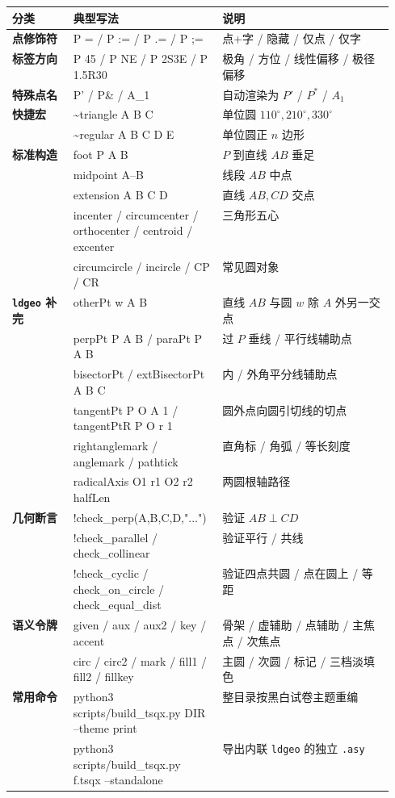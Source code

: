 \documentclass[11pt,oneside,fontset=none]{ctexbook}
\newcommand{\code}[1]{\texttt{#1}}
\begin{document}
\begin{table}[H]
  \centering
  \footnotesize
  \renewcommand{\arraystretch}{1.04}
  \begin{tabularx}{\linewidth}{@{}>{\bfseries}p{0.16\linewidth}>{\ttfamily\raggedright\arraybackslash}p{0.39\linewidth}>{\raggedright\arraybackslash}X@{}}
    \toprule
    分类 & 典型写法 & 说明 \\
    \midrule
    点修饰符 & P = / P := / P .= / P ;= & 点+字 / 隐藏 / 仅点 / 仅字 \\
    标签方向 & P 45 / P NE / P 2S3E / P 1.5R30 & 极角 / 方位 / 线性偏移 / 极径偏移 \\
    特殊点名 & P' / P\& / A\_1 & 自动渲染为 \(P'\) / \(P^{\ast}\) / \(A_1\) \\
    快捷宏 & \~{}triangle A B C & 单位圆 \(110^\circ, 210^\circ, 330^\circ\) \\
           & \~{}regular A B C D E & 单位圆正 \(n\) 边形 \\
    标准构造 & foot P A B & \(P\) 到直线 \(AB\) 垂足 \\
             & midpoint A--B & 线段 \(AB\) 中点 \\
             & extension A B C D & 直线 \(AB, CD\) 交点 \\
             & incenter / circumcenter / orthocenter / centroid / excenter & 三角形五心 \\
             & circumcircle / incircle / CP / CR & 常见圆对象 \\
    \code{ldgeo} 补完 & otherPt w A B & 直线 \(AB\) 与圆 \(w\) 除 \(A\) 外另一交点 \\
                      & perpPt P A B / paraPt P A B & 过 \(P\) 垂线 / 平行线辅助点 \\
                      & bisectorPt / extBisectorPt A B C & 内 / 外角平分线辅助点 \\
                      & tangentPt P O A 1 / tangentPtR P O r 1 & 圆外点向圆引切线的切点 \\
                      & rightanglemark / anglemark / pathtick & 直角标 / 角弧 / 等长刻度 \\
                      & radicalAxis O1 r1 O2 r2 halfLen & 两圆根轴路径 \\
    几何断言 & !check\_perp(A,B,C,D,"...") & 验证 \(AB \perp CD\) \\
             & !check\_parallel / check\_collinear & 验证平行 / 共线 \\
             & !check\_cyclic / check\_on\_circle / check\_equal\_dist & 验证四点共圆 / 点在圆上 / 等距 \\
    语义令牌 & given / aux / aux2 / key / accent & 骨架 / 虚辅助 / 点辅助 / 主焦点 / 次焦点 \\
             & circ / circ2 / mark / fill1 / fill2 / fillkey & 主圆 / 次圆 / 标记 / 三档淡填色 \\
    常用命令 & python3 scripts/build\_tsqx.py DIR --theme print & 整目录按黑白试卷主题重编 \\
             & python3 scripts/build\_tsqx.py f.tsqx --standalone & 导出内联 \code{ldgeo} 的独立 \code{.asy} \\
    \bottomrule
  \end{tabularx}
\end{table}
\end{document}
